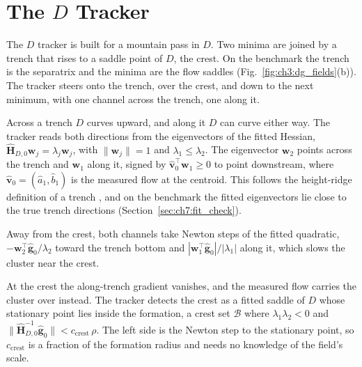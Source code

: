 \section{The $D$ Tracker}
\label{sec:ch7:sep_controller}

The $D$ tracker is built for a mountain pass in $D$. Two minima are
joined by a trench that rises to a saddle point of $D$, the crest. On the
benchmark the trench is the separatrix and the minima are the flow saddles
(Fig.~\ref{fig:ch3:dg_fields}(b)). The tracker steers onto the trench, over
the crest, and down to the next minimum, with one channel across the trench,
one along it.

Across a trench $D$ curves upward, and along it $D$ can curve either way.
The tracker reads both directions from the eigenvectors of the fitted
Hessian, $\hat{\mathbf{H}}_{D,0}\mathbf{w}_j = \lambda_j \mathbf{w}_j$,
with $\|\mathbf{w}_j\| = 1$ and $\lambda_1 \leq \lambda_2$. The
eigenvector $\mathbf{w}_2$ points across the trench and $\mathbf{w}_1$
along it, signed by $\hat{\mathbf{v}}_0^\top \mathbf{w}_1 \geq 0$ to point
downstream, where $\hat{\mathbf{v}}_0 = (\hat{a}_1, \hat{b}_1)$ is the
measured flow at the centroid. This follows the height-ridge definition
of a trench \cite{64}, and on the benchmark the fitted eigenvectors lie
close to the true trench directions (Section~\ref{sec:ch7:fit_check}).

Away from the crest, both channels take Newton steps of the fitted
quadratic, $-\mathbf{w}_2^\top\hat{\mathbf{g}}_0/\lambda_2$ toward the
trench bottom and $|\mathbf{w}_1^\top\hat{\mathbf{g}}_0|/|\lambda_1|$
along it, which slows the cluster near the crest.

At the crest the along-trench gradient vanishes, and the measured flow
carries the cluster over instead. The tracker detects the crest as a
fitted saddle of $D$ whose stationary point lies inside the formation, a
crest set $\mathcal{B}$ where $\lambda_1\lambda_2 < 0$ and
\mbox{$\|\hat{\mathbf{H}}_{D,0}^{-1}\hat{\mathbf{g}}_0\| < c_{\mathrm{crest}}\,\rho$}.
The left side is the Newton step to the stationary point, so
$c_{\mathrm{crest}}$ is a fraction of the formation radius and needs no
knowledge of the field's scale.

